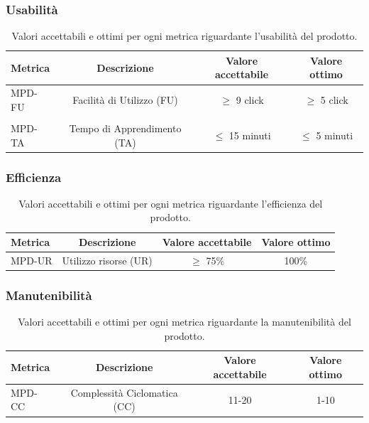 \documentclass[8pt]{article}
\begin{document}
\subsubsection{Usabilità}
\begin{table}[H]	
	\centering
	\begin{tabular}{lccc}
		\toprule
		\textbf{Metrica}& \textbf{Descrizione} & \textbf{Valore accettabile} & \textbf{Valore ottimo} \\
		\midrule
		MPD-FU & Facilità di Utilizzo (FU) & $\geq$ 9 click & $\geq$ 5 click \\\\
		MPD-TA & Tempo di Apprendimento (TA) & $\leq$ 15 minuti & $\leq$ 5 minuti \\
		\bottomrule
	\end{tabular}
	\caption{Valori accettabili e ottimi per ogni metrica riguardante l’usabilità del prodotto.}
	\label{table:Valori accettabili e ottimi per ogni metrica riguardante l’usabilità del prodotto.}
\end{table}
\subsubsection{Efficienza}
\begin{table}[H]	
	\centering
	\begin{tabular}{lccc}
		\toprule
		\textbf{Metrica}& \textbf{Descrizione} & \textbf{Valore accettabile} & \textbf{Valore ottimo} \\
		\midrule
		MPD-UR & Utilizzo risorse (UR) & $\geq$ 75\% & 100\% \\
		\bottomrule
	\end{tabular}
	\caption{Valori accettabili e ottimi per ogni metrica riguardante l’efficienza del prodotto.}
	\label{table:Valori accettabili e ottimi per ogni metrica riguardante l’efficienza del prodotto.}
\end{table}
\subsubsection{Manutenibilità}
\begin{table}[H]	
	\centering
	\begin{tabular}{lccc}
		\toprule
		\textbf{Metrica}& \textbf{Descrizione} & \textbf{Valore accettabile} & \textbf{Valore ottimo} \\
		\midrule
		MPD-CC & Complessità Ciclomatica (CC) & 11-20 & 1-10 \\
		\bottomrule
	\end{tabular}
	\caption{Valori accettabili e ottimi per ogni metrica riguardante la manutenibilità del prodotto.}
	\label{table:Valori accettabili e ottimi per ogni metrica riguardante la manutenibilità del prodotto.}
\end{table}
\clearpage
\end{document}
